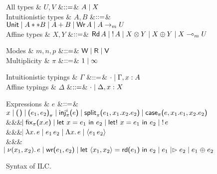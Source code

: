 \begin{figure*}[t]
  \begin{grammar}
    All types
    & $U,V$
    &$\mathrel{::=}$& $A \mathrel{\mid} X$
    \\
    Intuitionistic types
    & $A,B$
    &$\mathrel{::=}$& $\text{\textsf{Unit}} \mathrel{\mid} {A} ** {B} \mathrel{\mid} {A} + {B} \mathrel{\mid}
    \text{\textsf{Wr}}\,A \mathrel{\mid} {A}\rightarrow_{\footnotesize m}{U}$
    \\
    Affine types
    & $X,Y$
    &$\mathrel{::=}$& $\text{\textsf{Rd}}\,A \mathrel{\mid} {!}\,{A} \mathrel{\mid} {X}\otimes{Y} \mathrel{\mid} X \oplus
    Y \mathrel{\mid} {X}\multimap_{\footnotesize m}{U}$
  \end{grammar}
  \vspace{-.1cm}
  \begin{minipage}{.4\textwidth}
    \begin{grammar}
      Modes & $m,n,p$ &$\mathrel{::=}$& $\textsf{W} \mathrel{\mid} \textsf{R} \mathrel{\mid} \textsf{V}$
      \\
      Multiplicity & $\pi$ &$\mathrel{::=}$& $1 \mathrel{\mid} \infty$      
    \end{grammar}
  \end{minipage}%
  \begin{minipage}{.4\textwidth}
    \begin{grammar}
      Intuitionistic typings
      & $\Gamma$
      &$\mathrel{::=}$& $\cdot \mathrel{\mid} \Gamma,x:A$
      \\
      Affine typings
      & $\Delta$
      &$\mathrel{::=}$& $\cdot \mathrel{\mid} \Delta,x:X$
    \end{grammar}    
  \end{minipage}
  \begin{grammar}
    Expressions
    & $e$
        &$\mathrel{::=}$&
        $\eVar{x} \bnfalt \eUnit \bnfalt \ePair{e_1}{e_2}{\pi} \bnfalt \eInj{\pi}{i}{e} \bnfalt \eSplit{\pi}{e_1}{x_1}{x_2}{e_2} \bnfalt
    \eCase{\pi}{e}{x_1}{e_1}{x_2}{e_2}$
    \\ &&& $\hspace{-1.02ex}\mathrel{\mid} \text{\textsf{fix}}_{\pi}\textsf{(}{x}.{e}\textsf{)}
    \mathrel{\mid} \text{\textsf{let}}\ {x} = {e_1}\ \text{\textsf{in}}\ {e_2} \mathrel{\mid} \text{\textsf{let!}}\ {x} = {e_1}\ \text{\textsf{in}}\ {e_2} \mathrel{\mid} {!}\,{e}$
    \\ &&& $\hspace{-1.02ex}\mathrel{\mid} \lambda{x}.\,{e} \mathrel{\mid} e_1\,e_2 \mathrel{\mid} \Lambda{x}.\,{e}
    \mathrel{\mid} \langle{e_1}\,{e_2}\rangle$
    \\ &&& $\hspace{-1.02ex}\mathrel{\mid} \nu(x_1,x_2).\,e \mathrel{\mid} \text{\textsf{wr}}\textsf{(}{e_1},{e_2}\textsf{)}
    \mathrel{\mid} \text{\textsf{let}}\ {\langle{x_1},{x_2}\rangle} = {\text{\textsf{rd}}\textsf{(}{e_1}\textsf{)}}\ \text{\textsf{in}}\ {{e_2}} \mathrel{\mid} e_1 \mathrel{|\rhd} e_2 \mathrel{\mid} e_1 \mathrel{\oplus} e_2$
  \end{grammar}
  \caption{Syntax of ILC.}
  \label{fig:ilc-syntax}
\end{figure*}
